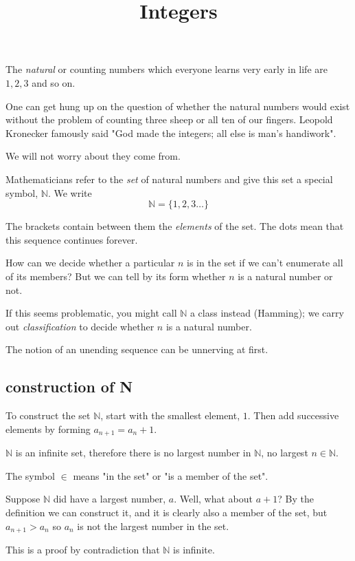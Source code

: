 \documentclass[11pt, oneside]{article}
\title{Integers}
\date{}
\begin{document}
\maketitle
\Large

The \emph{natural} or counting numbers which everyone learns very early in life are $1, 2, 3$ and so on.

One can get hung up on the question of whether the natural numbers would exist without the problem of counting three sheep or all ten of our fingers.  Leopold Kronecker famously said "God made the integers; all else is man's handiwork".

We will not worry about they come from.

Mathematicians refer to the \emph{set} of natural numbers and give this set a special symbol, $\mathbb{N}$.  We write
\[ \mathbb{N} = \{ 1, 2, 3 \dots \} \]

The brackets contain between them the \emph{elements} of the set. The dots mean that this sequence continues forever.

How can we decide whether a particular $n$ is in the set if we can't enumerate all of its members?  But we can tell by its form whether $n$ is a natural number or not.  

If this seems problematic, you might call $\mathbb{N}$ a class instead (Hamming);  we carry out \emph{classification} to decide whether $n$ is a natural number.

The notion of an unending sequence can be unnerving at first.

\subsection*{construction of N}

To construct the set $\mathbb{N}$, start with the smallest element, $1$.  Then add successive elements by forming $a_{n+1} = a_n + 1$.

$\mathbb{N}$ is an infinite set, therefore there is no largest number in $\mathbb{N}$, no largest $n \in \mathbb{N}$.

The symbol $\in$ means "in the set" or "is a member of the set".

Suppose $\mathbb{N}$ did have a largest number, $a$.  Well, what about $a + 1$?  By the definition we can construct it, and it is clearly also a member of the set, but $a_{n+1} > a_n$ so $a_n$ is not the largest number in the set.

This is a proof by contradiction that $\mathbb{N}$ is infinite.
\end{document}
